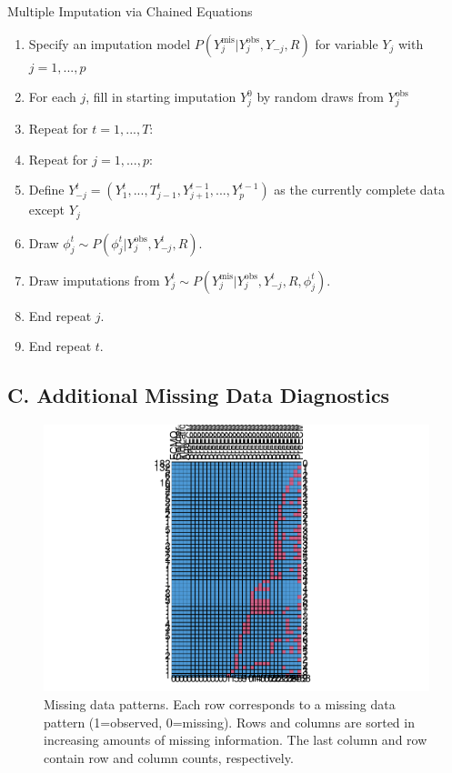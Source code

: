 \documentclass[12pt,]{article}
\begin{document}
\begin{algorithm}[H]

\caption{Multiple Imputation via Chained Equations}
\DontPrintSemicolon
\SetAlgoLined
\BlankLine

\begin{enumerate}
  \item Specify an imputation model $P(Y^{\text{mis}}_j \vert Y^{\text{obs}}_j, Y_{-j}, R)$ for variable $Y_j$ with $j=1,...,p$
  \item For each $j$, fill in starting imputation $Y^0_j$ by random draws from $Y^{\text{obs}}_j$
  \item Repeat for $t=1,...,T:$
  \item Repeat for $j=1,...,p:$
  \item Define $Y^t_{-j} = (Y^t_1,...,T^t_{j-1}, Y^{t-1}_{j+1},..., Y^{t-1}_p)$ as the currently complete data except $Y_j$ 
  \item Draw $\phi^t_j \sim P(\phi^t_j \vert Y^{\text{obs}}_j, Y^t_{-j}, R)$.
  \item Draw imputations from $Y^t_j \sim P(Y^{ \text{mis} }_j \vert Y^{ \text{obs} }_j, Y^t_{-j}, R, \phi^t_j)$.
  \item End repeat $j$.
  \item End repeat $t$.

\end{enumerate}
\BlankLine

\end{algorithm}

\subsection{C. Additional Missing Data
Diagnostics}\label{c.-additional-missing-data-diagnostics}

\begin{figure}[H]

{\centering \includegraphics[width=1\linewidth]{figure/graphics-unnamed-chunk-16-1} 

}

\caption{\label{fig:missing-data-patterns}Missing data patterns.  Each row corresponds to a missing data pattern (1=observed, 0=missing).  Rows and columns are sorted in increasing amounts of missing information.  The last column and row contain row and column counts, respectively.}\label{fig:unnamed-chunk-16}
\end{figure}
\end{document}
